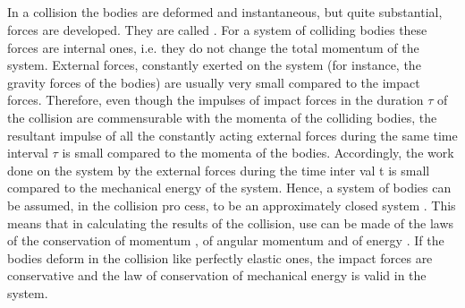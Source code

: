\subsection{}\label{3.5.2} In a collision the bodies are deformed and instantaneous, but quite substantial, forces are developed. They are called . For a system of colliding bodies these forces are internal ones, i.e. they do not change the total momentum of the system. External forces, constantly exerted on the system (for instance, the gravity forces of the bodies) are usually very small compared to the impact forces. Therefore, even though the impulses of impact forces  in the duration $\tau$ of the collision are commensurable with the momenta  of the colliding bodies, the resultant impulse of all the constantly acting external forces during the same time interval $\tau$ is small compared to the momenta of the bodies. Accordingly, the work done on the system by the external forces during the time inter­ val t is small compared to the mechanical energy of the system. Hence, a system of bodies can be assumed, in the collision pro­ cess, to be an approximately closed system . This means that in calculating the results of the collision, use can be made of the laws of the conservation of momentum , of angular momentum  and of energy . If the bodies deform in the collision like perfectly elastic ones, the impact forces are conservative and the law of conservation of mechanical energy  is valid in the system.

